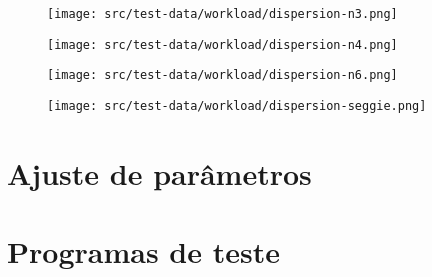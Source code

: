 \begin{figure}[htp]
\centering
\texttt{[image: src/test-data/workload/dispersion-n3.png]}
\label{fig:appdispn3}
\end{figure}

\begin{figure}[htp]
\centering
\texttt{[image: src/test-data/workload/dispersion-n4.png]}
\label{fig:appdispn4}
\end{figure}

\begin{figure}[htp]
\centering
\texttt{[image: src/test-data/workload/dispersion-n6.png]}
\label{fig:appdispn6}
\end{figure}

\begin{figure}[htp]
\centering
\texttt{[image: src/test-data/workload/dispersion-seggie.png]}
\label{fig:appdispseggie}
\end{figure}

\chapter{Ajuste de parâmetros}


\chapter{Programas de teste}\label{chap:programasteste}

\lstset{showspaces=false, frame=single, basicstyle=\scriptsize}

\begin{figure}[htp]
\begin{espacosimples}

\end{espacosimples}
\end{figure}

\begin{figure}[htp]
\begin{espacosimples}

\end{espacosimples}
\end{figure}

\begin{figure}[htp]
\begin{espacosimples}

\label{fig:progsimload}
\end{espacosimples}
\end{figure}
